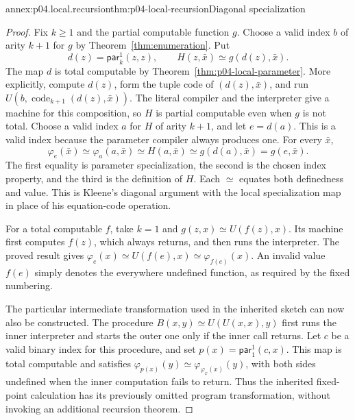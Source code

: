 \begin{annexitem}{annex:p04.local.recursion}{thm:p04-local-recursion}{Diagonal specialization}
\begin{proof}
Fix \(k\geq1\) and the partial computable function \(g\).  Choose a
valid index \(b\) of arity \(k+1\) for \(g\) by
Theorem~\ref{thm:enumeration}.  Put
\[
  d(z)=\mathsf{par}_k^1(z,z),
  \qquad
  H(z,\bar x)\simeq g(d(z),\bar x).
\]
The map \(d\) is total computable by
Theorem~\ref{thm:p04-local-parameter}.  More explicitly, compute
\(d(z)\), form the tuple code of \((d(z),\bar x)\), and run
\(U(b,\operatorname{code}_{k+1}(d(z),\bar x))\).
The literal compiler and the interpreter give a machine for this
composition, so \(H\) is partial computable even when \(g\) is not
total.  Choose a valid index \(a\) for \(H\) of arity \(k+1\), and
let \(e=d(a)\).  This is a valid index because the parameter compiler
always produces one.  For every \(\bar x\),
\[
 \varphi_e(\bar x)
 \simeq\varphi_a(a,\bar x)
 \simeq H(a,\bar x)
 \simeq g(d(a),\bar x)
 =g(e,\bar x).
\]
The first equality is parameter specialization, the second is the chosen
index property, and the third is the definition of \(H\).  Each
\(\simeq\) equates both definedness and value.  This is Kleene's
diagonal argument with the local specialization map in place of his
equation-code operation.

For a total computable \(f\), take \(k=1\) and
\(g(z,x)\simeq U(f(z),x)\).  Its machine first computes \(f(z)\),
which always returns, and then runs the interpreter.  The proved result
gives \(\varphi_e(x)\simeq U(f(e),x)\simeq\varphi_{f(e)}(x)\).
An invalid value \(f(e)\) simply denotes the everywhere undefined
function, as required by the fixed numbering.

The particular intermediate transformation used in the inherited sketch
can now also be constructed.  The procedure
\(B(x,y)\simeq U(U(x,x),y)\) first runs the inner interpreter and
starts the outer one only if the inner call returns.  Let \(c\) be a
valid binary index for this procedure, and set
\(p(x)=\mathsf{par}_1^1(c,x)\).  This map is total computable and
satisfies
\(\varphi_{p(x)}(y)\simeq\varphi_{\varphi_x(x)}(y)\), with both
sides undefined when the inner computation fails to return.  Thus the
inherited fixed-point calculation has its previously omitted program
transformation, without invoking an additional recursion theorem.
\end{proof}
\end{annexitem}
